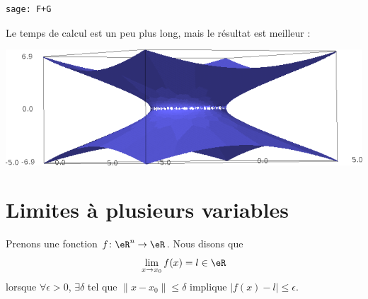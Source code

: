 \begin{example}
\begin{verbatim}
sage: F+G
    \end{verbatim}
    Le temps de calcul est un peu plus long, mais le résultat est meilleur :
    \begin{center}
            \includegraphics[width=15cm]{pictures_bitmap/AdSbon.png}
    \end{center}
\end{example}




\section{Limites à plusieurs variables}
\label{SecLimVarsPlus}

Prenons une fonction $f\colon \eR^n\to \eR$. Nous disons que
\begin{equation}
    \lim_{x\to x_0}f(x)=l\in\eR
\end{equation}
lorsque $\forall \epsilon>0$, $\exists\delta$ tel que $\| x-x_0 \|\leq\delta$ implique $| f(x)-l |\leq \epsilon$.

